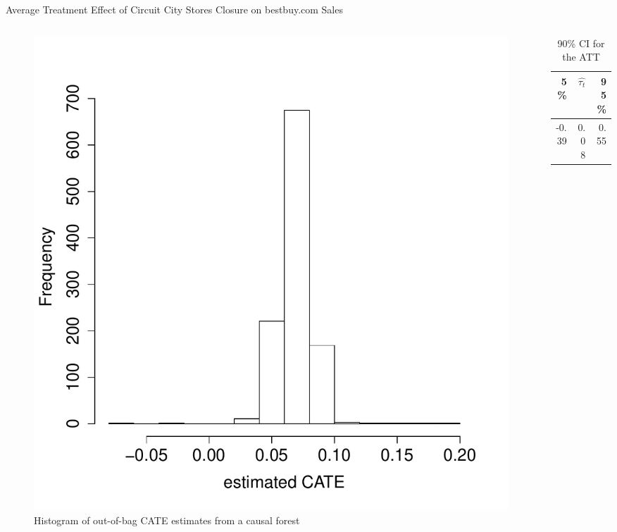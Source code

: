 \documentclass[mathserif, xcolor=table]{beamer}
\begin{document}
\begin{frame}{Average Treatment Effect of Circuit City Stores Closure on bestbuy.com Sales}
	\vspace{-1em}
	\begin{columns}
		\begin{column}{.6\textwidth}
			\begin{figure}[h]
				\centering
				\includegraphics[scale=0.3]{pic/tauhat1_bb_hist.pdf}
				\caption{ Histogram of out-of-bag CATE estimates from a causal forest}
				\label{fig:tauhat1_bb_hist}
			\end{figure}
		\end{column}
		
		\begin{column}{.39\textwidth}
			\begin{table}[h]
				\caption{90\% CI for the ATT} 
				\centering
				\begin{tabular}{rrr}
					\hline
					5\%  & $\hat{\tau_t}$ & 95\% \\ 
					\hline
					-0.39 & 0.08 & 0.55 \\ 
					\hline
				\end{tabular}
			\end{table}
		\end{column}
	\end{columns}
\end{frame}
\end{document}

